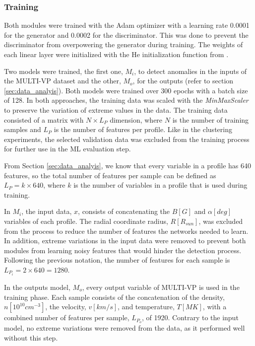\subsubsection*{Training}
Both modules were trained with the Adam optimizer with a learning rate 0.0001 for the generator and 0.0002 for the discriminator. This was done to prevent the discriminator from overpowering the generator during training. The weights of each linear layer were initialized with the He initialization function from \cite{He.Zhang.ea_DelvingDeepRectifiers_2015}.

Two models were trained, the first one, $M_i$, to detect anomalies in the inputs of the MULTI-VP dataset and the other, $M_o$, for the outputs (refer to section \ref{sec:data_analyis}). Both models were trained over 300 epochs with a batch size of 128. In both approaches, the training data was scaled with the \textit{MinMaxScaler} to preserve the variation of extreme values in the data. The training data consisted of a matrix with $N\times L_P$ dimension, where $N$ is the number of training samples and $L_P$ is the number of features per profile. Like in the clustering experiments, the selected validation data was excluded from the training process for further use in the ML evaluation step. 

From Section \ref{sec:data_analyis}, we know that every variable in a profile has 640 features, so the total number of features per sample can be defined as $L_P = k\times 640$, where $k$ is the number of variables in a profile that is used during training. 

In $M_i$, the input data, $x$, consists of concatenating the $B [G]$ and $\alpha [deg]$ variables of each profile. The radial coordinate radius, $R [R_{sun}]$, was excluded from the process to reduce the number of features the networks needed to learn. In addition, extreme variations in the input data were removed to prevent both modules from learning noisy features that would hinder the detection process. Following the previous notation, the number of features for each sample is $L_{P_i} = 2\times 640 = 1280$.

In the outputs model, $M_o$, every output variable of MULTI-VP is used in the training phase. Each sample consists of the concatenation of the density, $n [10^{10}cm^{-3}]$,  the velocity, $v [km/s]$, and temperature, $T [MK]$, with a combined number of features per sample, $L_{P_o}$, of 1920. Contrary to the input model, no extreme variations were removed from the data, as it performed well without this step.

